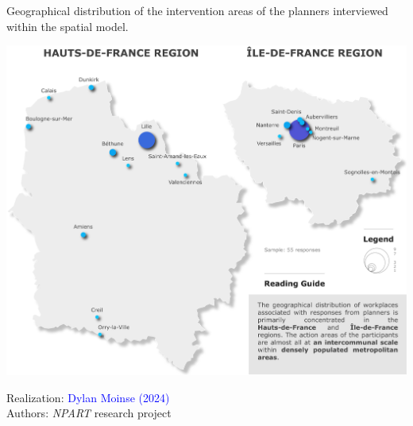 \begin{refsegment}
    \begin{carte}[h!]\vspace*{4pt}
        \caption{Geographical distribution of the intervention areas of the planners interviewed within the spatial model.}
        \label{fig-chap6:localisation-travail-amenageurs-interroges}
        \centerline{\includegraphics[width=1\columnwidth]{src/Figures/Chap-6/EN_NPART_Carte_lieu_travail_urbanistes.pdf}}
        \vspace{5pt}
        \begin{flushright}\scriptsize{
        Realization: \textcolor{blue}{Dylan Moinse (2024)}
        \\
        Authors: \textsl{NPART} research project
        }\end{flushright}
    \end{carte}


\end{refsegment}
